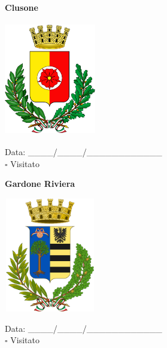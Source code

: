 \documentclass[a5paper,12pt]{article}
\begin{document}
\vspace{0.7cm}

\noindent
\begin{minipage}[t]{0.45\textwidth}
    \begin{center}
        \textbf{Clusone}
    \end{center}
    \vspace{-0.5cm} %
    \begin{center}
        \includegraphics[height= 5cm, width=4cm]{Lombardia/Stemma Clusone.png}
    \end{center}
    \vspace{-0.4cm} %
    \begin{flushleft}
        Data: \_\_\_\_/\_\_\_\_/\_\_\_\_\_\_\_\_\_\_\_\_ \\
        $\square$ Visitato
    \end{flushleft}
\end{minipage}
\hfill
\noindent
\begin{minipage}[t]{0.45\textwidth}
    \begin{center}
        \textbf{Gardone Riviera}
    \end{center}
    \vspace{-0.5cm} %
    \begin{center}
        \includegraphics[height= 5cm, width=4cm]{Lombardia/Stemma Gardone Riviera.png}
    \end{center}
    \vspace{-0.4cm} %
    \begin{flushleft}
        Data: \_\_\_\_/\_\_\_\_/\_\_\_\_\_\_\_\_\_\_\_\_ \\
        $\square$ Visitato
    \end{flushleft}
\end{minipage}
\end{document}

